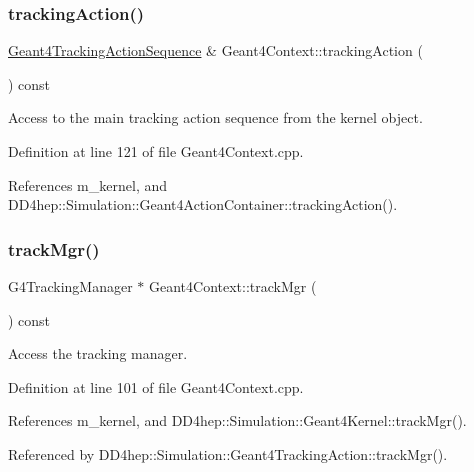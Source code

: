 \subsubsection{\texorpdfstring{tracking\+Action()}{trackingAction()}}
{\footnotesize\ttfamily \hyperlink{class_d_d4hep_1_1_simulation_1_1_geant4_tracking_action_sequence}{Geant4\+Tracking\+Action\+Sequence} \& Geant4\+Context\+::tracking\+Action (\begin{DoxyParamCaption}{ }\end{DoxyParamCaption}) const}



Access to the main tracking action sequence from the kernel object. 



Definition at line 121 of file Geant4\+Context.\+cpp.



References m\+\_\+kernel, and D\+D4hep\+::\+Simulation\+::\+Geant4\+Action\+Container\+::tracking\+Action().

\hypertarget{class_d_d4hep_1_1_simulation_1_1_geant4_context_adef15e8cef190429b9d0510b74a42b3c}{}\label{class_d_d4hep_1_1_simulation_1_1_geant4_context_adef15e8cef190429b9d0510b74a42b3c} 
\subsubsection{\texorpdfstring{track\+Mgr()}{trackMgr()}}
{\footnotesize\ttfamily G4\+Tracking\+Manager $\ast$ Geant4\+Context\+::track\+Mgr (\begin{DoxyParamCaption}{ }\end{DoxyParamCaption}) const}



Access the tracking manager. 



Definition at line 101 of file Geant4\+Context.\+cpp.



References m\+\_\+kernel, and D\+D4hep\+::\+Simulation\+::\+Geant4\+Kernel\+::track\+Mgr().



Referenced by D\+D4hep\+::\+Simulation\+::\+Geant4\+Tracking\+Action\+::track\+Mgr().



